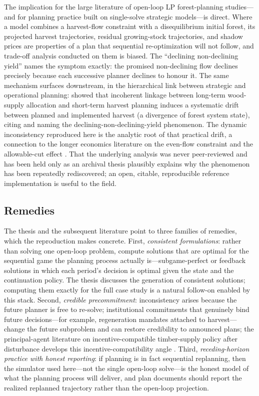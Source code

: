 The implication for the large literature of open-loop LP forest-planning studies---and for planning practice built on single-solve strategic models---is direct. Where a model combines a harvest-flow constraint with a disequilibrium initial forest, its projected harvest trajectories, residual growing-stock trajectories, and shadow prices are properties of a plan that sequential re-optimization will not follow, and trade-off analysis conducted on them is biased. The ``declining non-declining yield'' \citep[pp.~331--332]{gunn2007models} names the symptom exactly: the promised non-declining flow declines precisely because each successive planner declines to honour it. The same mechanism surfaces downstream, in the hierarchical link between strategic and operational planning: \citet{paradis2013risk} showed that incoherent linkage between long-term wood-supply allocation and short-term harvest planning induces a systematic drift between planned and implemented harvest (a divergence of forest system state), citing \citet{daugherty1991credibility} and naming the declining-non-declining-yield phenomenon. The dynamic inconsistency reproduced here is the analytic root of that practical drift, a connection to the longer economics literature on the even-flow constraint and the allowable-cut effect \citep{thompson1966traditional,schweitzer1972allowable,luckert1995allowable,hegan2000economic}. That the underlying analysis was never peer-reviewed and has been held only as an archival thesis plausibly explains why the phenomenon has been repeatedly rediscovered; an open, citable, reproducible reference implementation is useful to the field.

\hypertarget{remedies}{%
\subsection{Remedies}\label{remedies}}

The thesis and the subsequent literature point to three families of remedies, which the reproduction makes concrete. First, \emph{consistent formulations}: rather than solving one open-loop problem, compute solutions that are optimal for the sequential game the planning process actually is---subgame-perfect or feedback solutions in which each period's decision is optimal given the state and the continuation policy. The thesis discusses the generation of consistent solutions; computing them exactly for the full case study is a natural follow-on enabled by this stack. Second, \emph{credible precommitment}: inconsistency arises because the future planner is free to re-solve; institutional commitments that genuinely bind future decisions---for example, regeneration mandates attached to harvest---change the future subproblem and can restore credibility to announced plans; the principal-agent literature on incentive-compatible timber-supply policy after disturbance develops this incentive-compatibility angle \citep{bogle2015protecting}. Third, \emph{receding-horizon practice with honest reporting}: if planning is in fact sequential replanning, then the simulator used here---not the single open-loop solve---is the honest model of what the planning process will deliver, and plan documents should report the realized replanned trajectory rather than the open-loop projection.

